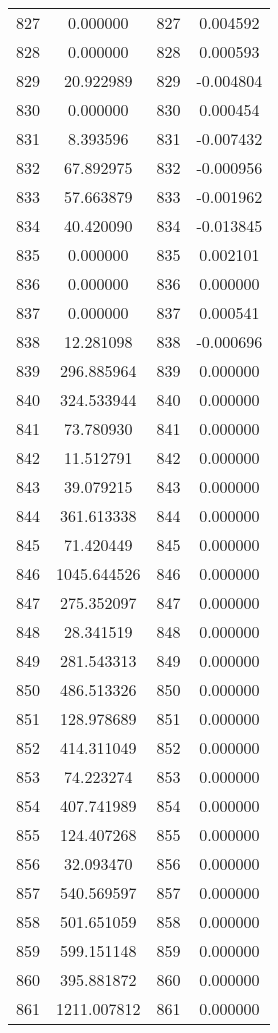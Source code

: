\documentclass[12pt]{article}
\begin{document}
\begin{longtable}{@{}cccc@{}}
827 & 0.000000 & 827 & 0.004592 \\
828 & 0.000000 & 828 & 0.000593 \\
829 & 20.922989 & 829 & -0.004804 \\
830 & 0.000000 & 830 & 0.000454 \\
831 & 8.393596 & 831 & -0.007432 \\
832 & 67.892975 & 832 & -0.000956 \\
833 & 57.663879 & 833 & -0.001962 \\
834 & 40.420090 & 834 & -0.013845 \\
835 & 0.000000 & 835 & 0.002101 \\
836 & 0.000000 & 836 & 0.000000 \\
837 & 0.000000 & 837 & 0.000541 \\
838 & 12.281098 & 838 & -0.000696 \\
839 & 296.885964 & 839 & 0.000000 \\
840 & 324.533944 & 840 & 0.000000 \\
841 & 73.780930 & 841 & 0.000000 \\
842 & 11.512791 & 842 & 0.000000 \\
843 & 39.079215 & 843 & 0.000000 \\
844 & 361.613338 & 844 & 0.000000 \\
845 & 71.420449 & 845 & 0.000000 \\
846 & 1045.644526 & 846 & 0.000000 \\
847 & 275.352097 & 847 & 0.000000 \\
848 & 28.341519 & 848 & 0.000000 \\
849 & 281.543313 & 849 & 0.000000 \\
850 & 486.513326 & 850 & 0.000000 \\
851 & 128.978689 & 851 & 0.000000 \\
852 & 414.311049 & 852 & 0.000000 \\
853 & 74.223274 & 853 & 0.000000 \\
854 & 407.741989 & 854 & 0.000000 \\
855 & 124.407268 & 855 & 0.000000 \\
856 & 32.093470 & 856 & 0.000000 \\
857 & 540.569597 & 857 & 0.000000 \\
858 & 501.651059 & 858 & 0.000000 \\
859 & 599.151148 & 859 & 0.000000 \\
860 & 395.881872 & 860 & 0.000000 \\
861 & 1211.007812 & 861 & 0.000000 \\

\end{longtable}
\end{document}
